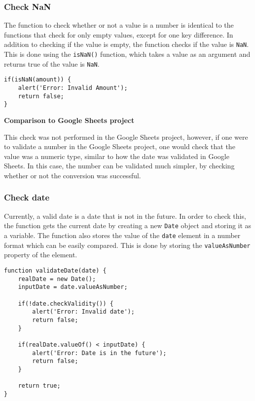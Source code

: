 \documentclass[letterpaper]{article}
\begin{document}
\subsubsection{Check NaN}

The function to check whether or not a value is a number is identical to the functions that check for only empty values, except for one key difference.
In addition to checking if the value is empty, the function checks if the value is \lstinline{NaN}.
This is done using the \lstinline{isNaN()} function, which takes a value as an argument and returns true of the value is \lstinline{NaN}.

\begin{lstlisting}[firstnumber=87]
if(isNaN(amount)) {
    alert('Error: Invalid Amount');
    return false;
}
\end{lstlisting}

\textbf{Comparison to Google Sheets project}

This check was not performed in the Google Sheets project, however, if one were to validate a number in the Google Sheets project, one would check that the value was a numeric type, similar to how the date was validated in Google Sheets.
In this case, the number can be validated much simpler, by checking whether or not the conversion was successful.

\subsubsection{Check date}

Currently, a valid date is a date that is not in the future.
In order to check this, the function gets the current date by creating a new \lstinline{Date} object and storing it as a variable.
The function also stores the value of the \lstinline{date} element in a number format which can be easily compared.
This is done by storing the \lstinline{valueAsNumber} property of the element.

\begin{lstlisting}[firstnumber=37]
function validateDate(date) {
    realDate = new Date();
    inputDate = date.valueAsNumber;

    if(!date.checkValidity()) {
        alert('Error: Invalid date');
        return false;
    }

    if(realDate.valueOf() < inputDate) {
        alert('Error: Date is in the future');
        return false;
    }

    return true;
}
\end{lstlisting}
\end{document}
